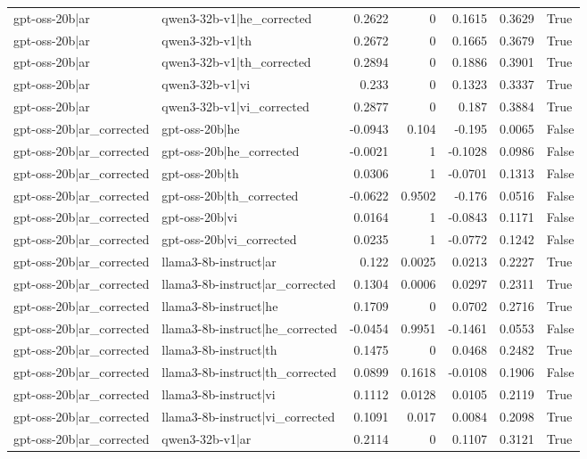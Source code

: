 \begin{table}
\begin{tabular}{l l r r r r l}
gpt-oss-20b|ar & qwen3-32b-v1|he_corrected & 0.2622 & 0 & 0.1615 & 0.3629 & True \\
gpt-oss-20b|ar & qwen3-32b-v1|th & 0.2672 & 0 & 0.1665 & 0.3679 & True \\
gpt-oss-20b|ar & qwen3-32b-v1|th_corrected & 0.2894 & 0 & 0.1886 & 0.3901 & True \\
gpt-oss-20b|ar & qwen3-32b-v1|vi & 0.233 & 0 & 0.1323 & 0.3337 & True \\
gpt-oss-20b|ar & qwen3-32b-v1|vi_corrected & 0.2877 & 0 & 0.187 & 0.3884 & True \\
gpt-oss-20b|ar_corrected & gpt-oss-20b|he & -0.0943 & 0.104 & -0.195 & 0.0065 & False \\
gpt-oss-20b|ar_corrected & gpt-oss-20b|he_corrected & -0.0021 & 1 & -0.1028 & 0.0986 & False \\
gpt-oss-20b|ar_corrected & gpt-oss-20b|th & 0.0306 & 1 & -0.0701 & 0.1313 & False \\
gpt-oss-20b|ar_corrected & gpt-oss-20b|th_corrected & -0.0622 & 0.9502 & -0.176 & 0.0516 & False \\
gpt-oss-20b|ar_corrected & gpt-oss-20b|vi & 0.0164 & 1 & -0.0843 & 0.1171 & False \\
gpt-oss-20b|ar_corrected & gpt-oss-20b|vi_corrected & 0.0235 & 1 & -0.0772 & 0.1242 & False \\
gpt-oss-20b|ar_corrected & llama3-8b-instruct|ar & 0.122 & 0.0025 & 0.0213 & 0.2227 & True \\
gpt-oss-20b|ar_corrected & llama3-8b-instruct|ar_corrected & 0.1304 & 0.0006 & 0.0297 & 0.2311 & True \\
gpt-oss-20b|ar_corrected & llama3-8b-instruct|he & 0.1709 & 0 & 0.0702 & 0.2716 & True \\
gpt-oss-20b|ar_corrected & llama3-8b-instruct|he_corrected & -0.0454 & 0.9951 & -0.1461 & 0.0553 & False \\
gpt-oss-20b|ar_corrected & llama3-8b-instruct|th & 0.1475 & 0 & 0.0468 & 0.2482 & True \\
gpt-oss-20b|ar_corrected & llama3-8b-instruct|th_corrected & 0.0899 & 0.1618 & -0.0108 & 0.1906 & False \\
gpt-oss-20b|ar_corrected & llama3-8b-instruct|vi & 0.1112 & 0.0128 & 0.0105 & 0.2119 & True \\
gpt-oss-20b|ar_corrected & llama3-8b-instruct|vi_corrected & 0.1091 & 0.017 & 0.0084 & 0.2098 & True \\
gpt-oss-20b|ar_corrected & qwen3-32b-v1|ar & 0.2114 & 0 & 0.1107 & 0.3121 & True \\

\end{tabular}
\end{table}
